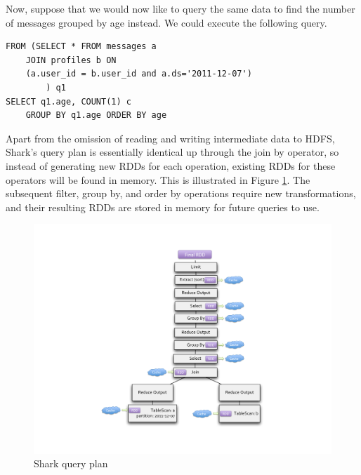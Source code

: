 Now, suppose that we would now like to query the same data to find the number of messages grouped by age instead. We could execute the following query. 

{\small
\begin{verbatim}
FROM (SELECT * FROM messages a 
    JOIN profiles b ON 
    (a.user_id = b.user_id and a.ds='2011-12-07')
        ) q1
SELECT q1.age, COUNT(1) c 
    GROUP BY q1.age ORDER BY age
\end{verbatim}
}

Apart from the omission of reading and writing intermediate data to HDFS, Shark's query plan is essentially identical up through the join by operator, so instead of generating new RDDs for each operation, existing RDDs for these operators will be found in memory. This is illustrated in Figure \ref{fig:sharkqp2}. The subsequent filter, group by, and order by operations require new transformations, and their resulting RDDs are stored in memory for future queries to use.

\begin{figure}
	\centering
	\includegraphics[width=\linewidth]{files/shark-qplan2.pdf}
	\caption{Shark query plan}
	\label{fig:sharkqp2}
\end{figure}


